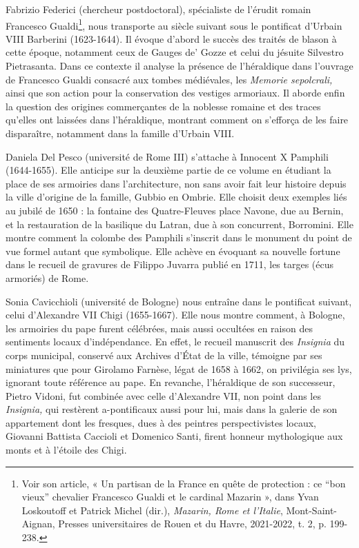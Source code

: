 \documentclass[12pt,twoside,openany]{book}
\begin{document}
Fabrizio Federici (chercheur postdoctoral), spécialiste de l’érudit romain Francesco Gualdi\footnote{Voir son article, « Un partisan de la France en quête de protection : ce “bon vieux” chevalier Francesco Gualdi et le cardinal Mazarin », dans Yvan Loskoutoff et Patrick Michel (dir.), \textit{Mazarin, Rome et l’Italie}, Mont-Saint-Aignan, Presses universitaires de Rouen et du Havre, 2021-2022, t. 2, p. 199-238.}, nous transporte au siècle suivant sous le pontificat d’Urbain VIII Barberini (1623-1644). Il évoque d’abord le succès des traités de blason à cette époque, notamment ceux de Gauges de’ Gozze et celui du jésuite Silvestro Pietrasanta. Dans ce contexte il analyse la présence de l’héraldique dans l’ouvrage de Francesco Gualdi consacré aux tombes médiévales, les \textit{Memorie sepolcrali,} ainsi que son action pour la conservation des vestiges armoriaux. Il aborde enfin la question des origines commerçantes de la noblesse romaine et des traces qu’elles ont laissées dans l’héraldique, montrant comment on s’efforça de les faire disparaître, notamment dans la famille d’Urbain VIII.

Daniela Del Pesco (université de Rome III) s’attache à Innocent X Pamphili (1644-1655). Elle anticipe sur la deuxième partie de ce volume en étudiant la place de ses armoiries dans l’architecture, non sans avoir fait leur histoire depuis la ville d’origine de la famille, Gubbio en Ombrie. Elle choisit deux exemples liés au jubilé de 1650 : la fontaine des Quatre-Fleuves place Navone, due au Bernin, et la restauration de la basilique du Latran, due à son concurrent, Borromini. Elle montre comment la colombe des Pamphili s’inscrit dans le monument du point de vue formel autant que symbolique. Elle achève en évoquant sa nouvelle fortune dans le recueil de gravures de Filippo Juvarra publié en 1711, les targes (écus armoriés) de Rome.

Sonia Cavicchioli (université de Bologne) nous entraîne dans le pontificat suivant, celui d’Alexandre VII Chigi (1655-1667). Elle nous montre comment, à Bologne, les armoiries du pape furent célébrées, mais aussi occultées en raison des sentiments locaux d’indépendance. En effet, le recueil manuscrit des \textit{Insignia }du corps municipal, conservé aux Archives d’État de la ville, témoigne par ses miniatures que pour Girolamo Farnèse, légat de 1658 à 1662, on privilégia ses lys, ignorant toute référence au pape. En revanche, l’héraldique de son successeur, Pietro Vidoni, fut combinée avec celle d’Alexandre VII, non point dans les \textit{Insignia,} qui restèrent a-pontificaux aussi pour lui, mais dans la galerie de son appartement dont les fresques, dues à des peintres perspectivistes locaux, Giovanni Battista Caccioli et Domenico Santi, firent honneur mythologique aux monts et à l’étoile des Chigi.
\end{document}
